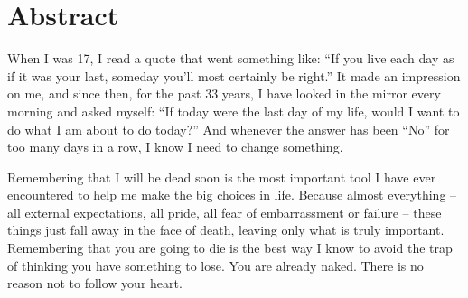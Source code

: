 \chapter*{Abstract}

When I was 17, I read a quote that went something like: “If you live each day as if it was your last, someday you’ll most certainly be right.” It made an impression on me, and since then, for the past 33 years, I have looked in the mirror every morning and asked myself: “If today were the last day of my life, would I want to do what I am about to do today?” And whenever the answer has been “No” for too many days in a row, I know I need to change something.

Remembering that I will be dead soon is the most important tool I have ever encountered to help me make the big choices in life. Because almost everything – all external expectations, all pride, all fear of embarrassment or failure – these things just fall away in the face of death, leaving only what is truly important. Remembering that you are going to die is the best way I know to avoid the trap of thinking you have something to lose. You are already naked. There is no reason not to follow your heart.

\thispagestyle{empty}
